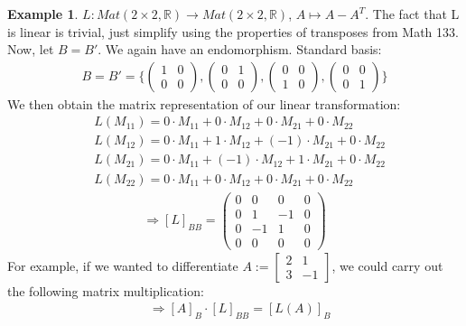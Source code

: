 \documentclass[a4paper, 12pt]{article}
\theoremstyle{definition}
\newtheorem{exmp}{Example}[section]
\theoremstyle{definition}
\theoremstyle{definition}
\theoremstyle{definition}
\begin{document}
{\begin{exmp}
	$L:  Mat(2 \times 2, \mathbb{R}) \rightarrow Mat(2 \times 2, \mathbb{R})$, $A \mapsto A - A^T$. The fact that L is linear is trivial, just simplify using the properties of transposes from Math 133. Now, let $B = B'$. We again have an endomorphism. Standard basis: 
	\begin{align*}
		B = B' = \{ \begin{pmatrix}
			1 & 0 \\
			0 & 0 
		\end{pmatrix}, \begin{pmatrix}
			0 & 1 \\
			0 & 0 
		\end{pmatrix}, \begin{pmatrix}
			0 & 0 \\
			1 & 0 
		\end{pmatrix}, \begin{pmatrix}
			0 & 0 \\
			0 & 1 
		\end{pmatrix}
		\}
	\end{align*}
	We then obtain the matrix representation of our linear transformation: 
	\begin{align*}
		& L(M_{11}) = 0 \cdot M_{11} + 0 \cdot M_{12} + 0 \cdot M_{21} + 0 \cdot M_{22} \\ 
		& L(M_{12}) = 0 \cdot M_{11} + 1 \cdot M_{12} + (-1) \cdot M_{21} + 0 \cdot M_{22} \\ 	
		& L(M_{21}) = 0 \cdot M_{11} + (-1) \cdot M_{12} + 1 \cdot M_{21} + 0 \cdot M_{22} \\
		& L(M_{22}) = 0 \cdot M_{11} + 0 \cdot M_{12} + 0 \cdot M_{21} + 0 \cdot M_{22} 
	\end{align*}
	\begin{align*}
		\Rightarrow [L]_{BB} = \begin{pmatrix}
			0 & 0 & 0 & 0 \\
			0 & 1 & -1 & 0 \\
			0 & -1 & 1 & 0 \\
			0 & 0 & 0 & 0 
		\end{pmatrix}
	\end{align*}
	For example, if we wanted to differentiate $A := \begin{bmatrix}
		2 & 1 \\
		3 & -1
	\end{bmatrix}$, we could carry out the following matrix multiplication: 
	\begin{align*}
		& \Rightarrow [A]_B \cdot [L]_{BB} = [L(A)]_B  \\

\end{align*}
\end{exmp}}
\end{document}
